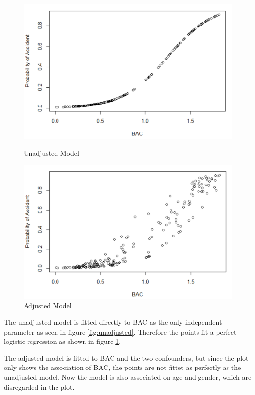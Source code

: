 \begin{figure}[!htb]
    \begin{minipage}{.5\textwidth}
        \centering
        \includegraphics[width=0.9\linewidth]{unadjusted.PNG}
        \caption{Unadjusted Model}
        \label{fig:unadjusted}
    \end{minipage}
    \begin{minipage}{.5\textwidth}
        \centering
        \includegraphics[width=0.9\linewidth]{adjusted.PNG}
        \caption{Adjusted Model}
        \label{fig:adjusted}
    \end{minipage}
\end{figure}

The unadjusted model is fitted directly to BAC as the only independent parameter as seen in figure \ref{fig:unadjusted}. Therefore the points fit a perfect logistic regression as shown in figure \ref{fig:adjusted}.

The adjusted model is fitted to BAC and the two confounders, but since the plot only shows the association of BAC, the points are not fittet as perfectly as the unadjusted model. Now the model is also associated on age and gender, which are disregarded in the plot.

